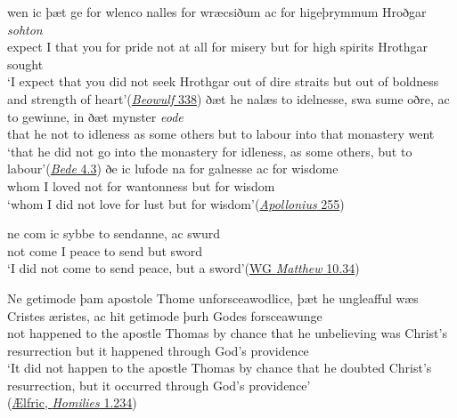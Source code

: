 \ea \label{ex:05-15}
\ea{}
\gll wen ic þæt ge for wlenco nalles for wræcsiðum ac for higeþrymmum Hroðgar \textit{sohton}\\
 expect I that you for pride {not at all} for {misery} but for {high spirits} Hrothgar {sought}\\
\glt `I expect that you did not seek Hrothgar out of dire straits but out of boldness and strength of heart'\hfill(\href{http://ebeowulf.uky.edu/ebeo4.0/CD/main.html}{\textit{Beowulf} 338})
\ex
\gll ðæt he nalæs to idelnesse, swa sume oðre, ac to gewinne, in ðæt mynster \textit{eode}\\
 that he not to idleness as some others but to labour into that monastery went\\
\glt `that he did not go into the monastery for idleness, as some others, but to labour'\hfill(\href{https://archive.org/details/oldenglishversio02bede/page/264/mode/2up?q=%22+pcet+he+nales+to+idelnesse%2C+swa+aume+o%27Sre%22&view=theater}{\textit{Bede} 4.3}) %
\ex
\gll ðe ic lufode na for galnesse ac for wisdome\\
 whom I loved not for wantonness but for wisdom\\
\glt `whom I did not love for lust but for wisdom'\hfill(\href{https://archive.org/details/anglosaxonversi00thorgoog/page/n34/mode/2up?q=%22for+galnesse%22&view=theater}{\textit{Apollonius} 255})
\z
\z

\ea \label{ex:05-18}
\gll ne com ic sybbe to sendanne, ac swurd\\
 not come I peace to send but sword\\
\glt `I did not come to send peace, but a sword'\hfill(\href{https://books.google.co.jp/books?id=twINAAAAIAAJ&newbks=1&newbks_redir=0&printsec=frontcover&pg=PA48&dq=%22ic+sybbe+to+sendanne%22&hl=en&redir_esc=y#v=onepage&q=%22ic%20sybbe%20to%20sendanne%22&f=false}{WG \textit{Matthew} 10.34})
\z

\ea \label{ex:05-19}
\gll Ne getimode þam apostole Thome unforsceawodlice, þæt he ungleafful wæs Cristes æristes, ac hit getimode þurh Godes forsceawunge\\ %
 not happened {to the} apostle Thomas {by chance} that he unbelieving was Christ's resurrection but it happened through God's providence\\
\glt `It did not happen to the apostle Thomas by chance that he doubted Christ's resurrection, but it occurred through God's providence'\\\hfill(\href{https://archive.org/details/homiliesanglosa00thorgoog/page/234/mode/2up?q=%22apostole+Thome+unforsceawodlice%22&view=theater}{Ælfric, \textit{Homilies} 1.234}) %
\z{}

